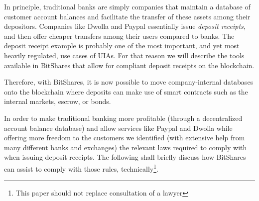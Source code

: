 \label{sec:uia:restrictions}

In principle, traditional banks are simply companies that maintain a database
of customer account balances and facilitate the transfer of these assets among
their depositors. Companies like Dwolla and Paypal essentially issue
\emph{deposit receipts}, and then offer cheaper transfers among their users
compared to banks. The deposit receipt example is probably one of the most
important, and yet most heavily regulated, use cases of UIAs. For that reason
we will describe the tools available in BitShares that allow for compliant
deposit receipts on the blockchain.

Therefore, with BitShares, it is now possible to move company-internal
databases onto the blockchain where deposits can make use of smart contracts
such as the internal markets, escrow, or bonds.

In order to make traditional banking more profitable (through a decentralized
account balance database) and allow services like Paypal and Dwolla while
offering more freedom to the customers we identified (with extensive help from
many different banks and exchanges) the relevant laws required to comply with
when issuing deposit receipts. The following shall briefly discuss how
BitShares can assist to comply with those rules, technically\footnote{This
paper should not replace consultation of a lawyer}.
